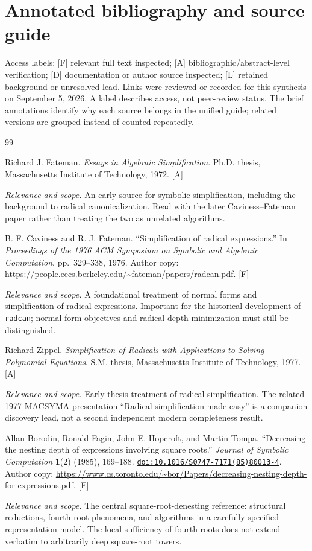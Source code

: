 \documentclass[11pt,letterpaper]{article}
\numberwithin{equation}{section}
\theoremstyle{definition}
\theoremstyle{remark}
\newcommand{\doi}[1]{\href{https://doi.org/#1}{\nolinkurl{doi:#1}}}
\newcommand{\status}[1]{\textsf{\small[#1]}}
\newcommand{\entrynote}[1]{\par\smallskip\noindent\emph{Relevance and scope.} #1}
\begin{document}
\section*{Annotated bibliography and source guide}
\noindent Access labels: \status{F} relevant full text inspected; \status{A} bibliographic/abstract-level verification; \status{D} documentation or author source inspected; \status{L} retained background or unresolved lead. Links were reviewed or recorded for this synthesis on September 5, 2026. A label describes access, not peer-review status. The brief annotations identify why each source belongs in the unified guide; related versions are grouped instead of counted repeatedly.
\begin{thebibliography}{99}
\setlength{\itemsep}{3pt}

Richard J. Fateman. \emph{Essays in Algebraic Simplification}. Ph.D. thesis, Massachusetts Institute of Technology, 1972. \status{A}
\entrynote{An early source for symbolic simplification, including the background to radical canonicalization. Read with the later Caviness--Fateman paper rather than treating the two as unrelated algorithms.}

B. F. Caviness and R. J. Fateman. ``Simplification of radical expressions.'' In \emph{Proceedings of the 1976 ACM Symposium on Symbolic and Algebraic Computation}, pp.~329--338, 1976. Author copy: \url{https://people.eecs.berkeley.edu/~fateman/papers/radcan.pdf}. \status{F}
\entrynote{A foundational treatment of normal forms and simplification of radical expressions. Important for the historical development of \texttt{radcan}; normal-form objectives and radical-depth minimization must still be distinguished.}

Richard Zippel. \emph{Simplification of Radicals with Applications to Solving Polynomial Equations}. S.M. thesis, Massachusetts Institute of Technology, 1977. \status{A}
\entrynote{Early thesis treatment of radical simplification. The related 1977 MACSYMA presentation ``Radical simplification made easy'' is a companion discovery lead, not a second independent modern completeness result.}

Allan Borodin, Ronald Fagin, John E. Hopcroft, and Martin Tompa. ``Decreasing the nesting depth of expressions involving square roots.'' \emph{Journal of Symbolic Computation} \textbf{1}(2) (1985), 169--188. \doi{10.1016/S0747-7171(85)80013-4}. Author copy: \url{https://www.cs.toronto.edu/~bor/Papers/decreasing-nesting-depth-for-expressions.pdf}. \status{F}
\entrynote{The central square-root-denesting reference: structural reductions, fourth-root phenomena, and algorithms in a carefully specified representation model. The local sufficiency of fourth roots does not extend verbatim to arbitrarily deep square-root towers.}


\end{thebibliography}
\end{document}
